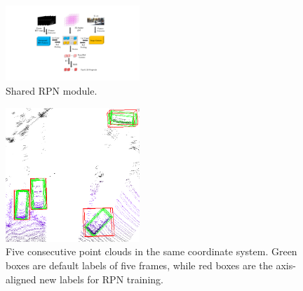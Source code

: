 \documentclass[a4paper, 10pt, conference]{ieeeconf}      %
\begin{document}
\begin{figure}
	\vspace{-0.6cm}
	\rule{0pt}{1ex}
	\begin{center}
		\includegraphics[trim={7cm, 2cm, 7.8cm, 2cm}, clip,width=0.45\textwidth]{images/rpn.pdf}
	\end{center}
	\caption{Shared RPN module.}
	\label{fig:rpn}
	\vspace{-0.5cm}
\end{figure}

\begin{figure}
	\vspace{-0.6cm}
	\rule{0pt}{1ex}
	\begin{center}
		\includegraphics[width=0.45\textwidth]{images/integrated_boxes.png}
	\end{center}
	\caption{Five consecutive point clouds in the same coordinate system. Green boxes are default labels of five frames, while red boxes are the axis-aligned new labels for RPN training.}
	\label{fig:integrated_boxes}
	\vspace{-0.6cm}
\end{figure}
\end{document}
